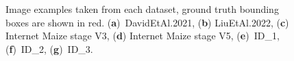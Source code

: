 \documentclass[aspectratio=43]{beamer}
\begin{document}
\begin{frame}
\begin{figure}
\begin{adjustwidth}
    \end{adjustwidth}
  \caption{Image examples taken from each dataset, ground truth bounding boxes are shown  in red. %
    (\textbf{a})~DavidEtAl.2021, 
    (\textbf{b}) LiuEtAl.2022, 
    (\textbf{c}) Internet Maize stage V3,
    (\textbf{d}) Internet Maize stage V5,
    (\textbf{e})~ID\_1,
    (\textbf{f})~ID\_2,
    (\textbf{g})~ID\_3.}
\end{figure}
\end{frame}
\end{document}
